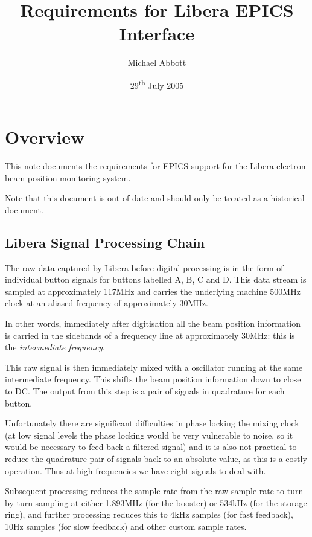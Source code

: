 \documentclass[
    a4paper,
    fleqn
]{article}
\begin{document}
\title{Requirements for Libera EPICS Interface}
\author{Michael Abbott}
\date{29\textsuperscript{th} July 2005}
\maketitle

\section{Overview}

This note documents the requirements for EPICS support for the Libera
electron beam position monitoring system.

Note that this document is out of date and should only be treated as a
historical document.

\subsection{Libera Signal Processing Chain}

The raw data captured by Libera before digital processing is in the
form of individual button signals for buttons labelled A, B, C and D.
This data stream is sampled at approximately 117MHz and carries the
underlying machine 500MHz clock at an aliased frequency of
approximately 30MHz.

In other words, immediately after digitisation all the beam position
information is carried in the sidebands of a frequency line at
approximately 30MHz: this is the \emph{intermediate frequency}.

This raw signal is then immediately mixed with a oscillator running at
the same intermediate frequency.  This shifts the beam position
information down to close to DC.  The output from this step is a pair
of signals in quadrature for each button.

Unfortunately there are significant difficulties in phase locking the
mixing clock (at low signal levels the phase locking would be very
vulnerable to noise, so it would be necessary to feed back a filtered
signal) and it is also not practical to reduce the quadrature pair of
signals back to an absolute value, as this is a costly operation.
Thus at high frequencies we have eight signals to deal with.

Subsequent processing reduces the sample rate from the raw sample rate
to turn-by-turn sampling at either 1.893MHz (for the booster) or
534kHz (for the storage ring), and further processing reduces this to
4kHz samples (for fast feedback), 10Hz samples (for slow feedback) and
other custom sample rates.
\end{document}
